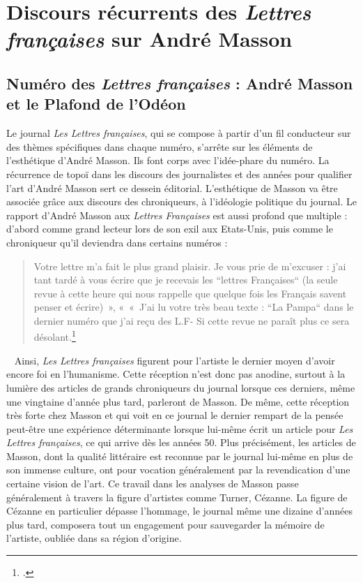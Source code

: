 \section{Discours récurrents des \emph{Lettres françaises} sur André Masson}

\subsection{Numéro des \emph{Lettres françaises} : André Masson et le Plafond de l'Odéon }


Le journal \emph{Les Lettres françaises}, qui se compose à partir d’un fil conducteur sur des thèmes spécifiques dans chaque numéro, s’arrête  sur les éléments de l’esthétique d’André Masson.  Ils font corps avec l’idée-phare du numéro.  La récurrence de topoï dans les discours des journalistes et des années pour qualifier l’art d’André Masson sert ce dessein éditorial. L’esthétique de Masson va être associée grâce aux discours des chroniqueurs, à l’idéologie politique du journal. Le rapport d’André Masson aux \emph{Lettres Françaises} est aussi profond que multiple : d’abord comme grand lecteur lors de son exil aux Etats-Unis, puis comme le chroniqueur qu'il deviendra dans certains numéros : 

\begin{quote}
Votre lettre m’a fait le plus grand plaisir. Je vous prie de m’excuser : j’ai tant tardé à vous écrire que je recevais les “lettres Françaises“ (la seule revue à cette heure qui nous rappelle que quelque fois les Français savent penser et écrire) », « « J’ai lu votre très beau texte : “La Pampa“ dans le dernier numéro que j’ai reçu des L.F- Si cette revue ne paraît plus ce sera désolant.\footcite[p478]{anneessurrealistes}\end{quote}
 
	Ainsi, \emph{Les Lettres françaises }figurent pour l’artiste le dernier moyen d’avoir encore foi en l’humanisme. Cette réception n’est donc pas anodine, surtout à la lumière des articles de grands chroniqueurs du journal lorsque ces derniers, même une vingtaine d’année plus tard, parleront de Masson. De même, cette réception très forte chez Masson et qui voit en ce journal le dernier rempart de la pensée peut-être une expérience déterminante lorsque lui-même écrit un article pour \emph{Les Lettres françaises}, ce qui arrive dès les années 50. Plus précisément, les articles de Masson, dont la qualité littéraire est reconnue par le journal lui-même en plus de son immense culture, ont pour vocation généralement par la revendication d’une certaine vision de l’art. Ce travail dans les analyses de Masson passe généralement à travers la figure d’artistes comme Turner, Cézanne. La figure de Cézanne en particulier dépasse l’hommage, le journal même une dizaine d’années plus tard, composera tout un engagement pour sauvegarder la mémoire de l’artiste, oubliée dans sa région d’origine. 

